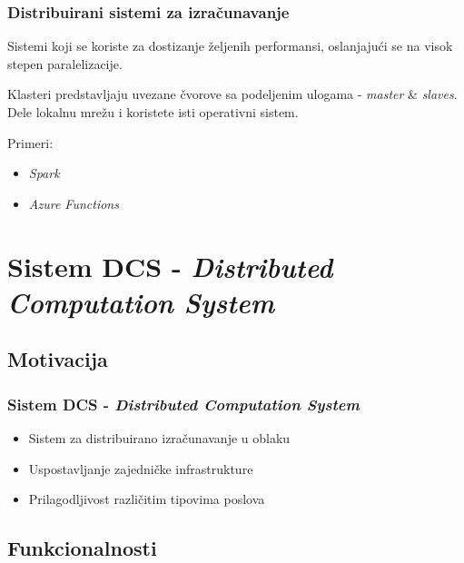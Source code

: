 \documentclass[11pt]{beamer}
\begin{document}

\begin{frame}
	\frametitle{Distribuirani sistemi za izračunavanje}

	Sistemi koji se koriste za dostizanje željenih performansi, oslanjajući se na visok stepen paralelizacije.
	
	\bigskip

	Klasteri predstavljaju uvezane čvorove sa podeljenim ulogama - \emph{master} \& \emph{slaves}. Dele lokalnu mrežu i koristete isti operativni sistem.

	\bigskip

	Primeri:
	\begin{itemize}
		\item \emph{Spark}
		\item \emph{Azure Functions}
	\end{itemize}

\end{frame}


\section{Sistem DCS - \emph{Distributed Computation System}}

\subsection{Motivacija}

\begin{frame}
	\frametitle{Sistem DCS - \emph{Distributed Computation System}}

	\begin{itemize}
		\item Sistem za distribuirano izračunavanje u oblaku
		\item Uspostavljanje zajedničke infrastrukture
		\item Prilagodljivost različitim tipovima poslova
	\end{itemize}

\end{frame}


\subsection{Funkcionalnosti}
\end{document}
